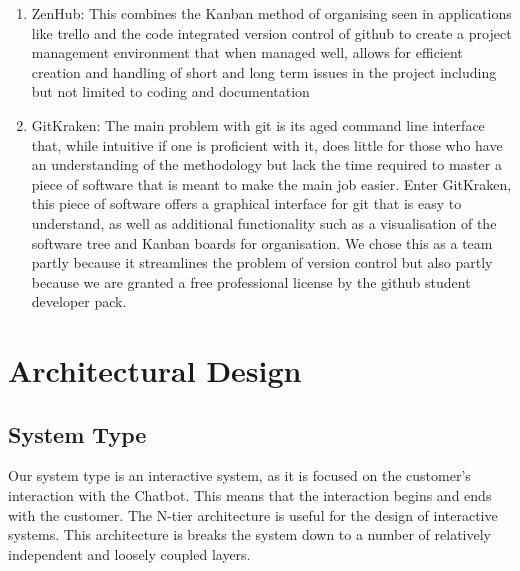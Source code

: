 \documentclass[11pt]{article}
\begin{document}
\begin{enumerate}
\begin{enumerate}
		\item ZenHub: This combines the Kanban method of organising seen in applications like trello and the code integrated version control of github to create a project management environment that when managed well, allows for efficient creation and handling of short and long term issues in the project including but not limited to coding and documentation
		\item GitKraken: The main problem with git is its aged command line interface that, while intuitive if one is proficient with it, does little for those who have an understanding of the methodology but lack the time required to master a piece of software that is meant to make the main job easier. Enter GitKraken, this piece of software offers a graphical interface for git that is easy to understand, as well as additional functionality such as a visualisation of the software tree and Kanban boards for organisation. We chose this as a team partly because it streamlines the problem of version control but also partly because we are granted a free professional license by the github student developer pack.
	\end{enumerate}
\end{enumerate}


\section{Architectural Design}

\subsection{System Type}

Our system type is an interactive system, as it is focused on the customer's interaction with the Chatbot. This means that the interaction begins and ends with the customer. The N-tier architecture is useful for the design of interactive systems. This architecture is breaks the system down to a number of relatively independent and loosely coupled layers.\cite{Book:1}
\end{document}
